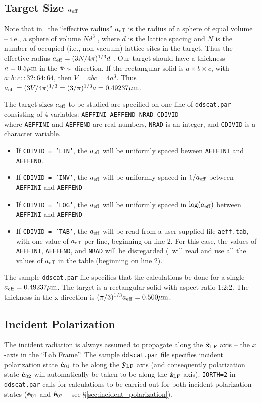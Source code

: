 \subsection{ Target Size ${a}_{\rm eff}$}

Note that in \ddscat\ the ``effective radius'' 
$a_{\rm eff}$ 
is the radius of a sphere of
equal volume -- i.e., a sphere of volume $Nd^3$ , where $d$ 
is the lattice spacing
and $N$ is the number of occupied (i.e., non-vacuum) 
lattice sites in the target.
Thus the effective radius ${a}_{\rm eff} = (3N/4\pi)^{1/3}d$ .
Our target should have a thickness $a=0.5{\mu{\rm m}}$ in the $\hat{\bf x}_{\rm TF}$ direction.
If the rectangular solid is $a\times b\times c$, with $a:b:c::32:64:64$,
then $V=abc=4a^3$.  Thus
${a}_{\rm eff}=(3V/4\pi)^{1/3}=(3/\pi)^{1/3}a = 0.49237{\mu{\rm m}}$.

The target sizes ${a}_{\rm eff}$ to be studied are specified on one line of
{\tt ddscat.par} consisting of 4 variables:
 {\tt AEFFINI AEFFEND NRAD CDIVID}\\
where {\tt AEFFINI} and {\tt AEFFEND} are real numbers, {\tt NRAD} is
an integer, and {\tt CDIVID} is a character variable.
\begin{itemize}
\item If {\tt CDIVID = 'LIN'}, the ${a}_{\rm eff}$ will be uniformly spaced
beween {\tt AEFFINI} and {\tt AEFFEND}.
\item If {\tt CDIVID = 'INV'}, the ${a}_{\rm eff}$ will be uniformly spaced in
$1/{a}_{\rm eff}$ between {\tt AEFFINI} and {\tt AEFFEND}
\item If {\tt CDIVID = 'LOG'}, the ${a}_{\rm eff}$ will be uniformly spaced
in $\log({a}_{\rm eff})$ between {\tt AEFFINI} and {\tt AEFFEND}
\item If {\tt CDIVID = 'TAB'}, the ${a}_{\rm eff}$ will be read from a
user-supplied file {\tt aeff.tab}, with one value of ${a}_{\rm eff}$ per line,
beginning on line 2.
For this case, the values of {\tt AEFFINI}, {\tt AEFFEND}, 
and {\tt NRAD} will be disregarded (\ddscat\ will read and use all the
values of ${a}_{\rm eff}$ in the table (beginning on line 2).
\end{itemize}
The sample {\tt ddscat.par} file specifies that the calculations be done
for a single ${a}_{\rm eff}=0.49237{\mu{\rm m}}$.
The target is a rectangular solid with aspect ratio 1:2:2.  The
thickness in the x direction is $(\pi/3)^{1/3}{a}_{\rm eff}=0.500{\mu{\rm m}}$.

\subsection{ Incident Polarization}
The incident radiation is always assumed to propagate along the $\hat{\bf x}_{\rm LF}$ axis --
the $x$-axis in
the ``Lab Frame''.  
The sample {\tt ddscat.par} file specifies incident polarization
state ${\hat{\bf e}}_{01}$ to be along the $\hat{\bf y}_{\rm LF}$ axis 
(and consequently polarization state ${\hat{\bf e}}_{02}$
will automatically be taken to be along the $\hat{\bf z}_{\rm LF}$ axis).  
{\tt IORTH=2} in {\tt ddscat.par}
calls for calculations to be carried out for both incident polarization
states (${\hat{\bf e}}_{01}$ and ${\hat{\bf e}}_{02}$
-- see \S\ref{sec:incident_polarization}).

